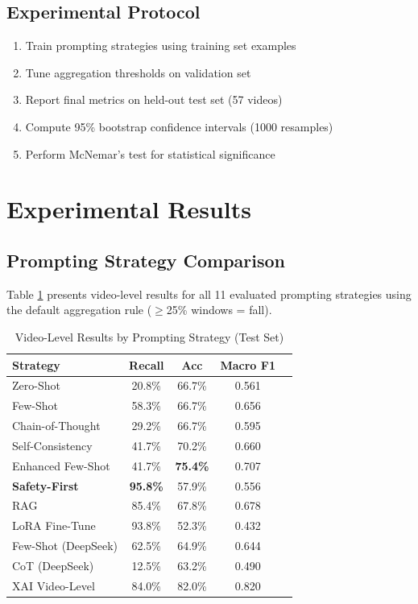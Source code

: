 \documentclass[conference]{IEEEtran}
\begin{document}
\subsection{Experimental Protocol}

\begin{enumerate}[leftmargin=*]
    \item Train prompting strategies using training set examples
    \item Tune aggregation thresholds on validation set
    \item Report final metrics on held-out test set (57 videos)
    \item Compute 95\% bootstrap confidence intervals (1000 resamples)
    \item Perform McNemar's test for statistical significance
\end{enumerate}

\section{Experimental Results}

\subsection{Prompting Strategy Comparison}

Table \ref{tab:main_results} presents video-level results for all 11 evaluated prompting strategies using the default aggregation rule ($\geq$25\% windows = fall).

\begin{table}[H]
\centering
\caption{Video-Level Results by Prompting Strategy (Test Set)}
\label{tab:main_results}
\begin{tabular}{lcccc}
\toprule
\textbf{Strategy} & \textbf{Recall} & \textbf{Acc} & \textbf{Macro F1} \\
\midrule
Zero-Shot & 20.8\% & 66.7\% & 0.561 \\
Few-Shot & 58.3\% & 66.7\% & 0.656 \\
Chain-of-Thought & 29.2\% & 66.7\% & 0.595 \\
Self-Consistency & 41.7\% & 70.2\% & 0.660 \\
Enhanced Few-Shot & 41.7\% & \textbf{75.4\%} & 0.707 \\
\textbf{Safety-First} & \textbf{95.8\%} & 57.9\% & 0.556 \\
RAG & 85.4\% & 67.8\% & 0.678 \\
LoRA Fine-Tune & 93.8\% & 52.3\% & 0.432 \\
Few-Shot (DeepSeek) & 62.5\% & 64.9\% & 0.644 \\
CoT (DeepSeek) & 12.5\% & 63.2\% & 0.490 \\
XAI Video-Level & 84.0\% & 82.0\% & 0.820 \\
\bottomrule
\end{tabular}
\end{table}
\end{document}
